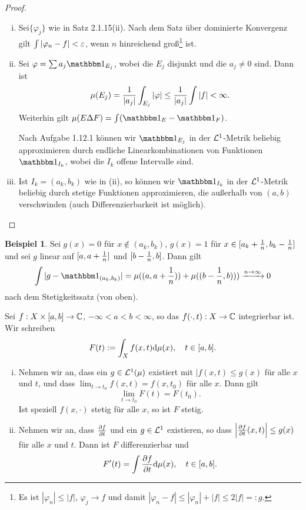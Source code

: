 \documentclass[
 a4paper,
 12pt,
 parskip=half
 ]{scrreprt}
\theoremstyle{plain}
\theoremstyle{definition}
\newtheorem*{exmp*}{Beispiel}
\numberwithin{equation}{section}
\begin{document}
\begin{proof}
 \begin{enumerate}[(i)]
  \item Sei$\{ \varphi_j \}$ wie in Satz 2.1.15(ii). Nach dem Satz über dominierte Konvergenz gilt $\int |\varphi_n - f| < \varepsilon$, wenn $n$ hinreichend groß\footnote{Es ist $|\varphi_n| \le |f|$, $\varphi_j \to f$ und damit $| \varphi_n - f| \le |\varphi_n| + |f| \le 2 |f| =: g$.} ist.
  \item Sei $\varphi = \sum a_j \ind_{E_j}$, wobei die $E_j$ disjunkt und die $a_j \ne 0$ sind. Dann ist 
  \[ \mu(E_j)  = \frac{1}{|a_j|} \int_{E_j} |\varphi| \le \frac{1}{|a_j|} \int |f| < \infty. \]
  Weiterhin gilt $\mu( E \Delta F ) = \int( \ind_E - \ind_F )$. 
  
  Nach Aufgabe 1.12.1 können wir $\ind_{E_j}$ in der $\mathcal{L}^1$-Metrik beliebig approximieren durch endliche Linearkombinationen von Funktionen $\ind_{I_k}$, wobei die $I_k$ offene Intervalle sind.
  \item Ist $I_k = (a_k, b_k)$ wie in (ii), so können wir $\ind_{I_k}$ in der $\mathcal{L}^1$-Metrik beliebig durch stetige Funktionen approximieren, die außerhalb von $(a,b)$ verschwinden (auch Differenzierbarkeit ist möglich). \qedhere
 \end{enumerate}
\end{proof}

\begin{exmp*}
 Sei $g(x) = 0$ für $x \notin (a_k,b_k)$, $g(x) = 1$ für $x \in [a_k + \frac{1}{n}, b_k - \frac{1}{n}]$ und sei $g$ linear auf $[a, a + \frac{1}{n}]$ und $[b-\frac{1}{n},b]$. Dann gilt
 \[ \int | g - \ind_{(a_k,b_k)} | = \mu(( a, a+\rez{n})) + \mu( (b-\rez{n},b) )) \xrightarrow{n \to \infty} 0 \]
 nach dem Stetigkeitssatz (von oben).
\end{exmp*}

\begin{thm}
 Sei $f:X \times [a,b] \to \mathbb{C}$, $-\infty < a < b < \infty$, so das $f( \cdot, t ) : X \to \mathbb{C}$ integrierbar ist. Wir schreiben
 \[ F(t) := \int_X f( x, t ) \mathrm{d} \mu(x), \quad t \in [a,b]. \]
 \begin{enumerate}[(i)]
  \item Nehmen wir an, dass ein $g \in \mathcal{L}^1(\mu)$ existiert mit $|f(x,t) \le g(x)$ für alle $x$ und $t$, und dass $\lim_{t \to t_0} f(x,t) = f(x,t_0)$ für alle $x$. Dann gilt
  \[ \lim_{t \to t_0} F(t) = F(t_0). \]
  Ist speziell $f(x, \cdot)$ stetig für alle $x$, so ist $F$ stetig.
  \item Nehmen wir an, dass $\frac{\partial f}{\partial t}$ und ein $g \in \mathcal{L}^1$ existieren, so dass $\left| \frac{\partial f}{\partial t} (x,t) \right| \le g(x)$ für alle $x$ und $t$. Dann ist $F$ differenzierbar und 
  \[ F'(t) = \int \frac{\partial f}{\partial t} \mathrm{d} \mu(x), \quad t \in [a,b]. \]
 \end{enumerate}
\end{thm}
\end{document}
